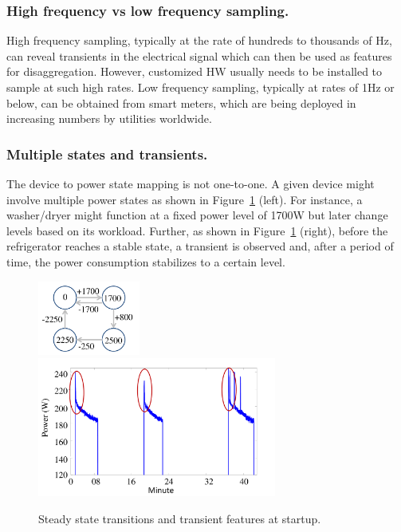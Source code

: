 \subsubsection*{High frequency vs low frequency sampling.}
High frequency sampling, typically at the rate of hundreds to thousands of
Hz, can reveal transients in the electrical signal which can then be used as
features for disaggregation. However, customized HW usually needs to be
installed to sample at such high rates.
Low frequency sampling, typically at rates of 1Hz or below, can be obtained
from smart meters, which are being deployed in increasing numbers by utilities
worldwide.

\subsubsection*{Multiple states and transients.}
The device to power state mapping is not one-to-one.
A given device might involve multiple power states
as shown in Figure~\ref{fig_sample} (left).
For instance, a washer/dryer might function at a fixed power level of
1700W but later change levels based on its workload.
Further,
as shown in Figure~\ref{fig_sample} (right), before the refrigerator reaches a
stable state, a transient is observed and,
after a period of time, the power consumption stabilizes to a certain level.

\begin{figure}[!hbp]
\centering
\includegraphics[width=0.3\textwidth]{disaggfigs/washdryer.pdf}
\includegraphics[width=0.7\textwidth]{disaggfigs/refrigerator.pdf}
\caption{Steady state transitions and transient features at startup.}
\label{fig_sample}
\end{figure}

